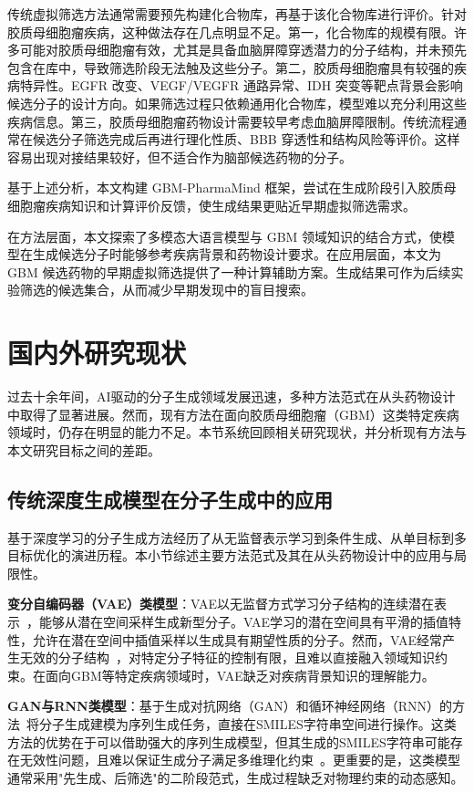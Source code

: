 传统虚拟筛选方法通常需要预先构建化合物库，再基于该化合物库进行评价。针对胶质母细胞瘤疾病，这种做法存在几点明显不足。第一，化合物库的规模有限。许多可能对胶质母细胞瘤有效，尤其是具备血脑屏障穿透潜力的分子结构，并未预先包含在库中，导致筛选阶段无法触及这些分子。第二，胶质母细胞瘤具有较强的疾病特异性。EGFR 改变、VEGF/VEGFR 通路异常、IDH 突变等靶点背景会影响候选分子的设计方向。如果筛选过程只依赖通用化合物库，模型难以充分利用这些疾病信息。第三，胶质母细胞瘤药物设计需要较早考虑血脑屏障限制。传统流程通常在候选分子筛选完成后再进行理化性质、BBB 穿透性和结构风险等评价。这样容易出现对接结果较好，但不适合作为脑部候选药物的分子。

基于上述分析，本文构建 GBM-PharmaMind 框架，尝试在生成阶段引入胶质母细胞瘤疾病知识和计算评价反馈，使生成结果更贴近早期虚拟筛选需求。

在方法层面，本文探索了多模态大语言模型与 GBM 领域知识的结合方式，使模型在生成候选分子时能够参考疾病背景和药物设计要求。在应用层面，本文为 GBM 候选药物的早期虚拟筛选提供了一种计算辅助方案。生成结果可作为后续实验筛选的候选集合，从而减少早期发现中的盲目搜索。


\section{国内外研究现状}\label{sec:related-work}

过去十余年间，AI驱动的分子生成领域发展迅速，多种方法范式在从头药物设计中取得了显著进展。然而，现有方法在面向胶质母细胞瘤（GBM）这类特定疾病领域时，仍存在明显的能力不足。本节系统回顾相关研究现状，并分析现有方法与本文研究目标之间的差距。

\subsection{传统深度生成模型在分子生成中的应用}\label{sec:traditional-dl}

基于深度学习的分子生成方法经历了从无监督表示学习到条件生成、从单目标到多目标优化的演进历程。本小节综述主要方法范式及其在从头药物设计中的应用与局限性。

\textbf{变分自编码器（VAE）类模型}：VAE以无监督方式学习分子结构的连续潜在表示~\cite{GomezBombarelli2018}，能够从潜在空间采样生成新型分子。VAE学习的潜在空间具有平滑的插值特性，允许在潜在空间中插值采样以生成具有期望性质的分子。然而，VAE经常产生无效的分子结构~\cite{GomezBombarelli2018}，对特定分子特征的控制有限，且难以直接融入领域知识约束。在面向GBM等特定疾病领域时，VAE缺乏对疾病背景知识的理解能力。

\textbf{GAN与RNN类模型}：基于生成对抗网络（GAN）和循环神经网络（RNN）的方法~\cite{Segler2017}将分子生成建模为序列生成任务，直接在SMILES字符串空间进行操作。这类方法的优势在于可以借助强大的序列生成模型，但其生成的SMILES字符串可能存在无效性问题，且难以保证生成分子满足多维理化约束~\cite{Segler2017}。更重要的是，这类模型通常采用"先生成、后筛选"的二阶段范式，生成过程缺乏对物理约束的动态感知。


